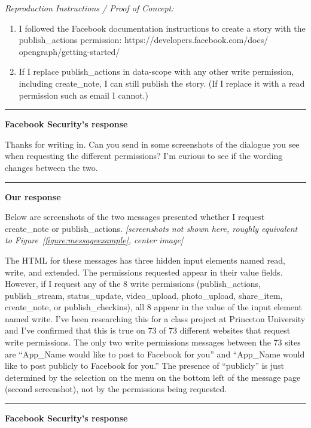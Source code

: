 \documentclass{sig-alternate}
\begin{document}
\noindent \emph{Reproduction Instructions / Proof of Concept:}
\begin{enumerate}
  \item I followed the Facebook documentation instructions to create a story with the publish\_actions permission: https://developers.facebook.com/docs/ opengraph/getting-started/
  \item If I replace publish\_actions in data-scope with any other write permission, including create\_note, I can still publish the story. (If I replace it with a read permission such as email I cannot.)
\end{enumerate}

\noindent\rule{6cm}{0.4pt}

\noindent\textbf{Facebook Security's response}

\noindent Thanks for writing in. Can you send in some screenshots of the dialogue you see when requesting the different permissions? I'm curious to see if the wording changes between the two.

\noindent\rule{6cm}{0.4pt}

\noindent\textbf{Our response}

\noindent Below are screenshots of the two messages presented whether I request create\_note or publish\_actions. \textit{[screenshots not shown here, roughly equivalent to Figure~\ref{figure:messageexample}, center image]}

The HTML for these messages has three hidden input elements named read, write, and extended. The permissions requested appear in their value fields. However, if I request any of the 8 write permissions (publish\_actions, publish\_stream, status\_update, video\_upload, photo\_upload, share\_item, create\_note, or publish\_checkins), all 8 appear in the value of the input element named write. I've been researching this for a class project at Princeton University and I've confirmed that this is true on 73 of 73 different websites that request write permissions. The only two write permissions messages between the 73 sites are ``App\_Name would like to post to Facebook for you'' and ``App\_Name would like to post publicly to Facebook for you.'' The presence of ``publicly'' is just determined by the selection on the menu on the bottom left of the message page (second screenshot), not by the permissions being requested.

\noindent\rule{6cm}{0.4pt}

\noindent\textbf{Facebook Security's response}
\end{document}
